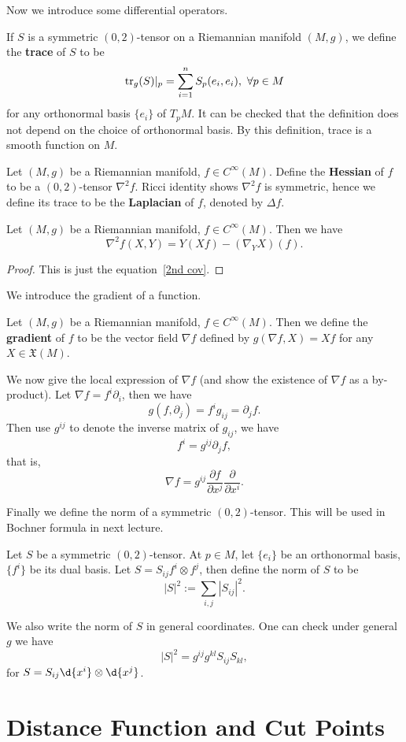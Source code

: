 Now we introduce some differential operators.

\begin{defn}
    If $S$ is a symmetric $(0,2)$-tensor on  a Riemannian manifold $(M,g)$, we define the \textbf{trace} of $S$ to be
    \[\operatorname{tr}_g(S)|_p=\sum_{i=1}^nS_p(e_i,e_i),\ \forall p\in M\]
    for any orthonormal basis $\{e_i\}$ of $T_pM$.
    It can be checked that the definition does not depend on the choice of orthonormal basis.
    By this definition, trace is a smooth function on $M$.
\end{defn}

\begin{defn}
    Let $(M,g)$ be a Riemannian manifold, $f\in C^\infty(M)$.
    Define the \textbf{Hessian} of $f$ to be a $(0,2)$-tensor $\nabla^2f$.
    Ricci identity shows $\nabla^2f$ is symmetric, hence we define its trace to be the \textbf{Laplacian} of $f$, denoted by $\Delta f$.
\end{defn}

\begin{prop}
    Let $(M,g)$ be a Riemannian manifold, $f\in C^\infty(M)$.
    Then we have
    \[\nabla^2f(X,Y)=Y(Xf)-(\nabla_YX)(f).\]
\end{prop}
\begin{proof}
    This is just the equation~\ref{2nd cov}.
\end{proof}

We introduce the gradient of a function.
\begin{defn}
    Let $(M,g)$ be a Riemannian manifold, $f\in C^\infty(M)$.
    Then we define the \textbf{gradient} of $f$ to be the vector field $\nabla f$ defined by $g(\nabla f,X)=Xf$ for any $X\in\mathfrak{X}(M)$.
\end{defn}

We now give the local expression of $\nabla f$ (and show the existence of $\nabla f$ as a by-product).
Let $\nabla f=f^i\partial_i$, then we have
\[g(f,\partial_j)=f^ig_{ij}=\partial_jf.\]
Then use $g^{ij}$ to denote the inverse matrix of $g_{ij}$, we have
\[f^i=g^{ij}\partial_jf,\]
that is,
\[\nabla f=g^{ij}\frac{\partial f}{\partial x^{j}}\frac{\partial{}}{\partial{x^i}}.\]

Finally we define the norm of a symmetric $(0,2)$-tensor.
This will be used in Bochner formula in next lecture.

\begin{defn}
    Let $S$ be a symmetric $(0,2)$-tensor.
    At $p\in M$, let $\{e_i\}$ be an orthonormal basis, $\{f^i\}$ be its dual basis.
    Let $S=S_{ij}f^i\otimes f^j$, then define the norm of $S$ to be
    \[|S|^2:=\sum_{i,j}|S_{ij}|^2.\]
\end{defn}

We also write the norm of $S$ in general coordinates.
One can check under general $g$ we have
\[|S|^2=g^{ij}g^{kl}S_{ij}S_{kl},\]
for $S=S_{ij}\d{x^i}\otimes\d{x^j}$.

\section{Distance Function and Cut Points}

